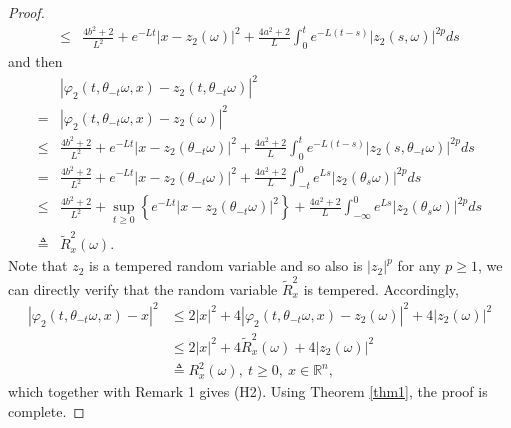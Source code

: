 \documentclass[10pt,a4paper]{amsart}
\begin{document}
\begin{proof}
\begin{align}
\leq& \frac{4b^2+2}{L^2}+e^{-Lt}|x-z_2(\omega)|^2+\frac{4a^2+2}{L}\int_0^te^{-L(t-s)}|z_2(s,\omega)|^{2p}ds\nonumber
\end{align}
and then
\begin{align}\label{eq35}
&|\varphi_2(t,\theta_{-t}\omega,x)-z_2(t,\theta_{-t}\omega)|^2\nonumber\\
=&|\varphi_2(t,\theta_{-t}\omega,x)-z_2(\omega)|^2\nonumber\\
\leq&\frac{4b^2+2}{L^2}+e^{-Lt}|x-z_2(\theta_{-t}\omega)|^2+\frac{4a^2+2}{L}\int_0^te^{-L(t-s)}|z_2(s,\theta_{-t}\omega)|^{2p}ds\nonumber\\
=&\frac{4b^2+2}{L^2}+e^{-Lt}|x-z_2(\theta_{-t}\omega)|^2+\frac{4a^2+2}{L}\int_{-t}^0e^{Ls}|z_2(\theta_s\omega)|^{2p}ds\nonumber\\
\leq&\frac{4b^2+2}{L^2}+\sup_{t\geq0}\left\{e^{-Lt}|x-z_2(\theta_{-t}\omega)|^2\right\}+\frac{4a^2+2}{L}\int_{-\infty}^0e^{Ls}|z_2(\theta_s\omega)|^{2p}ds\nonumber\\
\triangleq&\widetilde R_x^2(\omega).
\end{align}
Note that $z_2$ is a tempered random variable and so also is $|z_2|^p$ for any $p\geq1$, we can directly verify that the random variable $\widetilde R_x^2$ is tempered.
Accordingly,
\begin{align}\label{eq36}
|\varphi_2(t,\theta_{-t}\omega,x)-x|^2
&\leq2|x|^2+4|\varphi_2(t,\theta_{-t}\omega,x)-z_2(\omega)|^2+4|z_2(\omega)|^2\nonumber\\
&\leq2|x|^2+4\widetilde R_x^2(\omega)+4|z_2(\omega)|^2\nonumber\\
&\triangleq R_x^2(\omega),\ t\geq0,\ x\in\mathbb{R}^n,
\end{align}
which together with Remark 1 gives (H2). Using Theorem \ref{thm1}, the proof is complete.
\end{proof}
\end{document}

